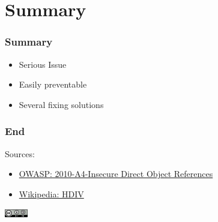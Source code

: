 \documentclass[aspectratio=169]{beamer}
\begin{document}
\section{Summary}

\begin{frame}
  \frametitle{Summary}
  \begin{itemize}
    \item Serious Issue
    \item Easily preventable
    \item Several fixing solutions
  \end{itemize}
\end{frame}

\begin{frame}
  \frametitle{End}
  Sources:\\
  \begin{itemize}
    \item \href{https://www.owasp.org/index.php/Top_10_2010-A4-Insecure_Direct_Object_References}{OWASP: 2010-A4-Insecure Direct Object References}
    \item \href{https://en.wikipedia.org/wiki/HDIV}{Wikipedia: HDIV}
  \end{itemize}

\includegraphics[width=1cm]{cc.png}
  
\end{frame}
\end{document}
